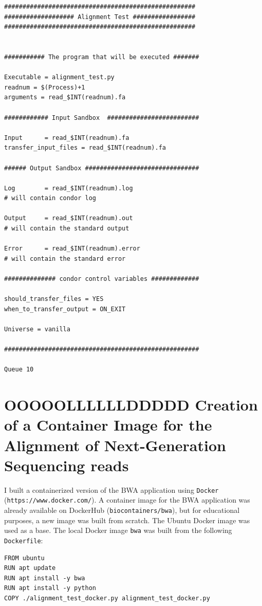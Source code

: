 \documentclass{article}
\begin{document}
\begin{lstlisting}
####################################################
################### Alignment Test #################
####################################################


########### The program that will be executed #######

Executable = alignment_test.py
readnum = $(Process)+1
arguments = read_$INT(readnum).fa

############ Input Sandbox  #########################

Input      = read_$INT(readnum).fa
transfer_input_files = read_$INT(readnum).fa

###### Output Sandbox ###############################

Log        = read_$INT(readnum).log
# will contain condor log

Output     = read_$INT(readnum).out
# will contain the standard output

Error      = read_$INT(readnum).error
# will contain the standard error

############## condor control variables #############

should_transfer_files = YES
when_to_transfer_output = ON_EXIT

Universe = vanilla

#####################################################

Queue 10
\end{lstlisting}




\section{OOOOOLLLLLLDDDDD Creation of a Container Image for the Alignment of Next-Generation Sequencing reads}
I built a containerized version of the BWA application using \texttt{Docker} (\texttt{https://www.docker.com/}).
A container image for the BWA application was already available on DockerHub (\texttt{biocontainers/bwa}), but for educational purposes, a new image was built from scratch.
The Ubuntu Docker image was used as a base.
The local Docker image \texttt{bwa} was built from the following \texttt{Dockerfile}:

\begin{lstlisting}
FROM ubuntu
RUN apt update
RUN apt install -y bwa
RUN apt install -y python
COPY ./alignment_test_docker.py alignment_test_docker.py
\end{lstlisting}
\end{document}
